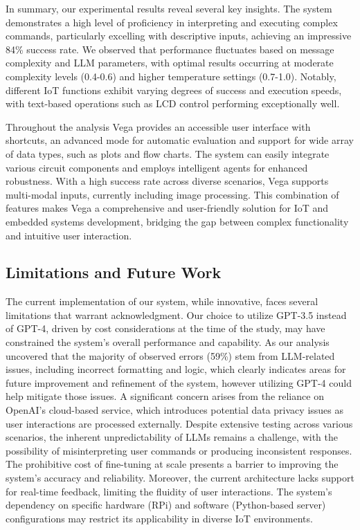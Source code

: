 \documentclass[lettersize,journal]{IEEEtran}
\begin{document}

In summary, our experimental results reveal several key insights. The system demonstrates a high level of proficiency in interpreting and executing complex commands, particularly excelling with descriptive inputs, achieving an impressive 84\% success rate. We observed that performance fluctuates based on message complexity and LLM parameters, with optimal results occurring at moderate complexity levels (0.4-0.6) and higher temperature settings (0.7-1.0). Notably, different IoT functions exhibit varying degrees of success and execution speeds, with text-based operations such as LCD control performing exceptionally well. 

Throughout the analysis Vega provides an accessible user interface with shortcuts, an advanced mode for automatic evaluation and support for wide array of data types, such as plots and flow charts. The system can easily integrate various circuit components and employs intelligent agents for enhanced robustness. With a high success rate across diverse scenarios, Vega supports multi-modal inputs, currently including image processing. This combination of features makes Vega a comprehensive and user-friendly solution for IoT and embedded systems development, bridging the gap between complex functionality and intuitive user interaction.

\subsection{Limitations and Future Work}
The current implementation of our system, while innovative, faces several limitations that warrant acknowledgment. Our choice to utilize GPT-3.5 instead of GPT-4, driven by cost considerations at the time of the study, may have constrained the system's overall performance and capability. As our analysis uncovered that the majority of observed errors (59\%) stem from LLM-related issues, including incorrect formatting and logic, which clearly indicates areas for future improvement and refinement of the system, however utilizing GPT-4 could help mitigate those issues. A significant concern arises from the reliance on OpenAI's cloud-based service, which introduces potential data privacy issues as user interactions are processed externally. Despite extensive testing across various scenarios, the inherent unpredictability of LLMs remains a challenge, with the possibility of misinterpreting user commands or producing inconsistent responses. The prohibitive cost of fine-tuning at scale presents a barrier to improving the system's accuracy and reliability. Moreover, the current architecture lacks support for real-time feedback, limiting the fluidity of user interactions. The system's dependency on specific hardware (RPi) and software (Python-based server) configurations may restrict its applicability in diverse IoT environments.
\end{document}
